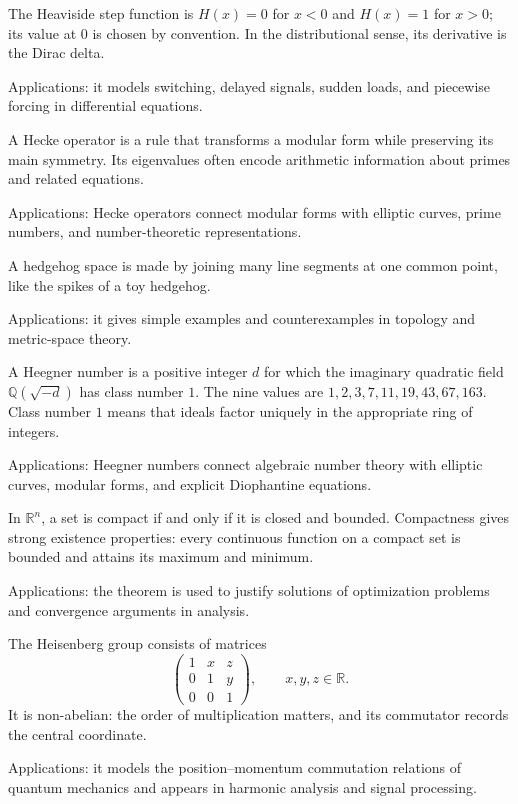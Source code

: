 The Heaviside step function is $H(x)=0$ for $x<0$ and $H(x)=1$ for $x>0$; its value at $0$ is chosen by convention. In the distributional sense, its derivative is the Dirac delta. \par\noindent Applications: it models switching, delayed signals, sudden loads, and piecewise forcing in differential equations.

A Hecke operator is a rule that transforms a modular form while preserving its main symmetry. Its eigenvalues often encode arithmetic information about primes and related equations. \par\noindent Applications: Hecke operators connect modular forms with elliptic curves, prime numbers, and number-theoretic representations.

A hedgehog space is made by joining many line segments at one common point, like the spikes of a toy hedgehog. \par\noindent Applications: it gives simple examples and counterexamples in topology and metric-space theory.

A Heegner number is a positive integer $d$ for which the imaginary quadratic field $\mathbb{Q}(\sqrt{-d})$ has class number $1$. The nine values are $1,2,3,7,11,19,43,67,163$. Class number $1$ means that ideals factor uniquely in the appropriate ring of integers. \par\noindent Applications: Heegner numbers connect algebraic number theory with elliptic curves, modular forms, and explicit Diophantine equations.

In $\mathbb{R}^n$, a set is compact if and only if it is closed and bounded. Compactness gives strong existence properties: every continuous function on a compact set is bounded and attains its maximum and minimum. \par\noindent Applications: the theorem is used to justify solutions of optimization problems and convergence arguments in analysis.

The Heisenberg group consists of matrices
\[
\begin{pmatrix}1&x&z\\0&1&y\\0&0&1\end{pmatrix},\qquad x,y,z\in\mathbb{R}.
\]
It is non-abelian: the order of multiplication matters, and its commutator records the central coordinate. \par\noindent Applications: it models the position--momentum commutation relations of quantum mechanics and appears in harmonic analysis and signal processing.

